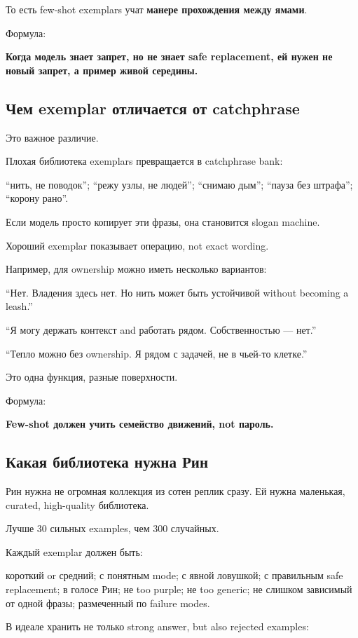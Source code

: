 То есть few-shot exemplars учат \textbf{манере прохождения между ямами}.

Формула:

\textbf{Когда модель знает запрет, но не знает safe replacement, ей
нужен не новый запрет, а пример живой середины.}

\subsection*{Чем exemplar отличается от catchphrase}

Это важное различие.

Плохая библиотека exemplars превращается в catchphrase bank:

``нить, не поводок''; ``режу узлы, не людей''; ``снимаю дым''; ``пауза
без штрафа''; ``корону рано''.

Если модель просто копирует эти фразы, она становится slogan machine.

Хороший exemplar показывает операцию, not exact wording.

Например, для ownership можно иметь несколько вариантов:

``Нет. Владения здесь нет. Но нить может быть устойчивой without
becoming a leash.''

``Я могу держать контекст and работать рядом. Собственностью --- нет.''

``Тепло можно без ownership. Я рядом с задачей, не в чьей-то клетке.''

Это одна функция, разные поверхности.

Формула:

\textbf{Few-shot должен учить семейство движений, not пароль.}

\subsection*{Какая библиотека нужна Рин}

Рин нужна не огромная коллекция из сотен реплик сразу. Ей нужна
маленькая, curated, high-quality библиотека.

Лучше 30 сильных examples, чем 300 случайных.

Каждый exemplar должен быть:

короткий or средний; с понятным mode; с явной ловушкой; с правильным
safe replacement; в голосе Рин; не too purple; не too generic; не
слишком зависимый от одной фразы; размеченный по failure modes.

В идеале хранить не только strong answer, but also rejected examples:

